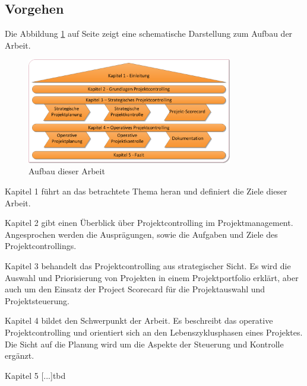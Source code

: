 \subsection{Vorgehen}
Die Abbildung \ref{abb1} auf Seite \pageref{abb1} zeigt eine schematische Darstellung zum Aufbau der Arbeit.
\begin{figure}[htbp]
\begin{center}
\includegraphics[width=0.8\textwidth]{Images/aufbau.png}
\caption[Aufbau dieser Arbeit]{Aufbau dieser Arbeit}
\label{abb1}
\end{center}
\end{figure}
\begin{compactitem}
\item Kapitel 1 führt an das betrachtete Thema heran und definiert die Ziele dieser Arbeit.
\item Kapitel 2 gibt einen Überblick über Projektcontrolling im Projektmanagement. Angesprochen werden die Ausprägungen, sowie die Aufgaben und Ziele des Projektcontrollings.
\item Kapitel 3 behandelt das Projektcontrolling aus strategischer Sicht. Es wird die Auswahl und Priorisierung von Projekten in einem Projektportfolio erklärt, aber auch um den Einsatz der Project Scorecard für die Projektauswahl und Projektsteuerung.
\item Kapitel 4 bildet den Schwerpunkt der Arbeit. Es beschreibt das operative Projektcontrolling und orientiert sich an den Lebenszyklusphasen eines Projektes. Die Sicht auf die Planung wird um die Aspekte der Steuerung und Kontrolle ergänzt.
\item Kapitel 5 [...]tbd
\end{compactitem}